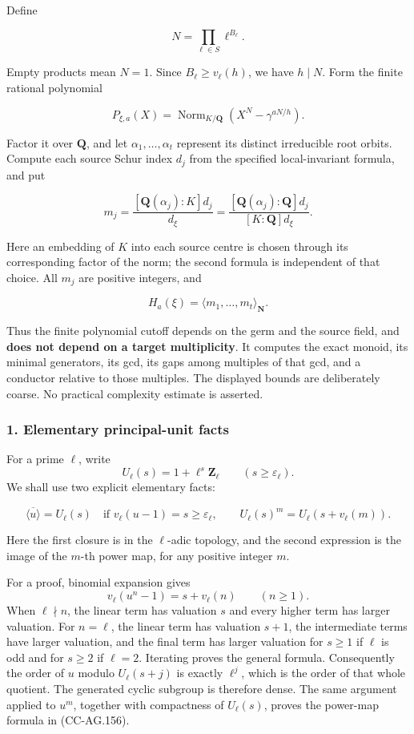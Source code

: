 Define

\[
 N=\prod_{\ell\in S}\ell^{B_\ell}.
 \tag{CC-AG.152}
\]

Empty products mean \(N=1\). Since \(B_\ell\ge v_\ell(h)\), we have
\(h\mid N\). Form the finite rational polynomial

\[
 P_{\xi,a}(X)=
 \operatorname{Norm}_{K/\mathbf Q}
       \left(X^N-\gamma^{aN/h}\right).
 \tag{CC-AG.153}
\]

Factor it over \(\mathbf Q\), and let \(\alpha_1,\ldots,\alpha_t\)
represent its distinct irreducible root orbits. Compute each source
Schur index \(d_j\) from the specified local-invariant formula, and put

\[
 m_j=\frac{[\mathbf Q(\alpha_j):K]d_j}{d_\xi}
     =\frac{[\mathbf Q(\alpha_j):\mathbf Q]d_j}
            {[K:\mathbf Q]d_\xi}.
 \tag{CC-AG.154}
\]

Here an embedding of \(K\) into each source centre is chosen through its
corresponding factor of the norm; the second formula is independent of
that choice. All \(m_j\) are positive integers, and

\[
                         H_a(\xi)=
                  \langle m_1,\ldots,m_t\rangle_{\mathbf N}.
 \tag{CC-AG.155}
\]

Thus the finite polynomial cutoff depends on the germ and the source
field, and \textbf{does not depend on a target multiplicity}. It
computes the exact monoid, its minimal generators, its gcd, its gaps
among multiples of that gcd, and a conductor relative to those
multiples. The displayed bounds are deliberately coarse. No practical
complexity estimate is asserted.

\subsubsection{1. Elementary principal-unit
facts}\label{elementary-principal-unit-facts}

For a prime \(\ell\), write \[
 U_\ell(s)=1+\ell^s\mathbf Z_\ell\qquad(s\ge\varepsilon_\ell).
\] We shall use two explicit elementary facts:

\[
 \overline{\langle u\rangle}=U_\ell(s)
 \quad\text{if }v_\ell(u-1)=s\ge\varepsilon_\ell,
 \qquad
 U_\ell(s)^m=U_\ell(s+v_\ell(m)).
 \tag{CC-AG.156}
\]

Here the first closure is in the \(\ell\)-adic topology, and the second
expression is the image of the \(m\)-th power map, for any positive
integer \(m\).

For a proof, binomial expansion gives \[
 v_\ell(u^n-1)=s+v_\ell(n)\qquad(n\ge1).
 \tag{CC-AG.157}
\] When \(\ell\nmid n\), the linear term has valuation \(s\) and every
higher term has larger valuation. For \(n=\ell\), the linear term has
valuation \(s+1\), the intermediate terms have larger valuation, and the
final term has larger valuation for \(s\ge1\) if \(\ell\) is odd and for
\(s\ge2\) if \(\ell=2\). Iterating proves the general formula.
Consequently the order of \(u\) modulo \(U_\ell(s+j)\) is exactly
\(\ell^j\), which is the order of that whole quotient. The generated
cyclic subgroup is therefore dense. The same argument applied to
\(u^m\), together with compactness of \(U_\ell(s)\), proves the
power-map formula in (CC-AG.156).

